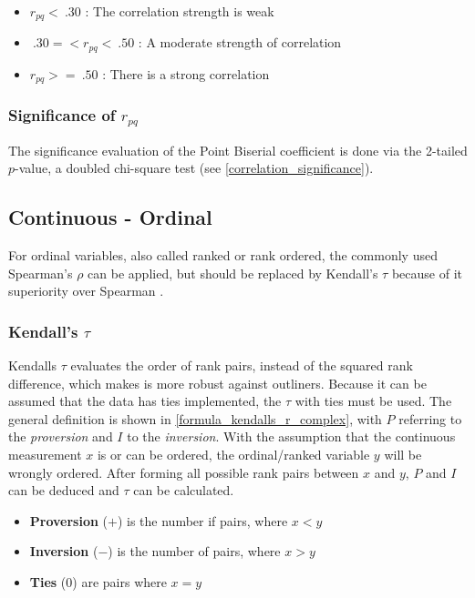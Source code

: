 \begin{itemize}
	\item $r_{pq} < \: .30$ : The correlation strength is weak
	\item $\: .30 =< r_{pq} < \: .50$ : A moderate strength of correlation
	\item $r_{pq} >= \: .50$ : There is a strong correlation
\end{itemize}

\subsubsection{Significance of $r_{pq}$}
The significance evaluation of the Point Biserial coefficient is done via the 2-tailed $p$-value, a doubled chi-square test (see \cref{correlation_significance}).

\subsection{Continuous - Ordinal}
For ordinal variables, also called ranked or rank ordered, the commonly used Spearman's $\rho$ can be applied, but should be replaced by Kendall's $\tau$ because of it superiority over Spearman \parencite{Newson2002}. 

\subsubsection{Kendall's $\tau$}
Kendalls $\tau$ evaluates the order of rank pairs, instead of the squared rank difference, which makes is more robust against outliners. Because it can be assumed that the data has ties implemented, the $\tau$ with ties must be used. The general definition is shown in \cref{formula_kendalls_r_complex}, with $P$ referring to the \textit{proversion} and $I$ to the \textit{inversion}. With the assumption that the continuous measurement $x$ is or can be ordered, the ordinal/ranked variable $y$ will be wrongly ordered. After forming all possible rank pairs between $x$ and $y$, $P$ and $I$ can be deduced and $\tau$ can be calculated. \parencite{Reiter2015,Bossart2017}

\begin{itemize}	
	\item[] \textbf{Proversion} ($+$) is the number if pairs, where $x < y$ 
	\item[] \textbf{Inversion} ($-$) is the number of pairs, where $x > y$ 
	\item[] \textbf{Ties} ($0$) are pairs where $x = y$
\end{itemize}

